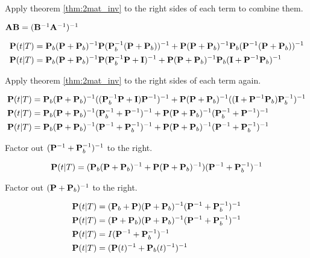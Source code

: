Apply theorem \ref{thm:2mat_inv} to the right sides of each term to combine
them.

\begin{theorem}
  \label{thm:2mat_inv}

  $\mathbf{A}\mathbf{B} = (\mathbf{B}^{-1}\mathbf{A}^{-1})^{-1}$
\end{theorem}

\begin{align*}
  \mathbf{P}(t|T) &=
    \mathbf{P}_b(\mathbf{P} + \mathbf{P}_b)^{-1}\mathbf{P}
      (\mathbf{P}_b^{-1}(\mathbf{P} + \mathbf{P}_b))^{-1} +
    \mathbf{P}(\mathbf{P} + \mathbf{P}_b)^{-1}\mathbf{P}_b
      (\mathbf{P}^{-1}(\mathbf{P} + \mathbf{P}_b))^{-1} \\
  \mathbf{P}(t|T) &= \mathbf{P}_b(\mathbf{P} + \mathbf{P}_b)^{-1}\mathbf{P}
      (\mathbf{P}_b^{-1}\mathbf{P} + \mathbf{I})^{-1} +
    \mathbf{P}(\mathbf{P} + \mathbf{P}_b)^{-1}\mathbf{P}_b
      (\mathbf{I} + \mathbf{P}^{-1}\mathbf{P}_b)^{-1}
\end{align*}

Apply theorem \ref{thm:2mat_inv} to the right sides of each term again.

\begin{align*}
  \mathbf{P}(t|T) &=
    \mathbf{P}_b(\mathbf{P} + \mathbf{P}_b)^{-1}
      ((\mathbf{P}_b^{-1}\mathbf{P} + \mathbf{I})\mathbf{P}^{-1})^{-1} +
    \mathbf{P}(\mathbf{P} + \mathbf{P}_b)^{-1}
      ((\mathbf{I} + \mathbf{P}^{-1}\mathbf{P}_b)\mathbf{P}_b^{-1})^{-1} \\
  \mathbf{P}(t|T) &=
    \mathbf{P}_b(\mathbf{P} + \mathbf{P}_b)^{-1}(\mathbf{P}_b^{-1} + \mathbf{P}^{-1})^{-1} +
    \mathbf{P}(\mathbf{P} + \mathbf{P}_b)^{-1}(\mathbf{P}_b^{-1} + \mathbf{P}^{-1})^{-1} \\
  \mathbf{P}(t|T) &= \mathbf{P}_b(\mathbf{P} + \mathbf{P}_b)^{-1}
    (\mathbf{P}^{-1} + \mathbf{P}_b^{-1})^{-1} +
    \mathbf{P}(\mathbf{P} + \mathbf{P}_b)^{-1}(\mathbf{P}^{-1} + \mathbf{P}_b^{-1})^{-1}
\end{align*}

Factor out $(\mathbf{P}^{-1} + \mathbf{P}_b^{-1})^{-1}$ to the right.

\begin{equation*}
  \mathbf{P}(t|T) =
    (\mathbf{P}_b(\mathbf{P} + \mathbf{P}_b)^{-1} + \mathbf{P}(\mathbf{P} + \mathbf{P}_b)^{-1})
    (\mathbf{P}^{-1} + \mathbf{P}_b^{-1})^{-1}
\end{equation*}

Factor out $(\mathbf{P} + \mathbf{P}_b)^{-1}$ to the right.

\begin{align}
  \mathbf{P}(t|T) &=
    (\mathbf{P}_b + \mathbf{P})(\mathbf{P} + \mathbf{P}_b)^{-1}
    (\mathbf{P}^{-1} + \mathbf{P}_b^{-1})^{-1} \nonumber \\
  \mathbf{P}(t|T) &=
    (\mathbf{P} + \mathbf{P}_b)(\mathbf{P} + \mathbf{P}_b)^{-1}
    (\mathbf{P}^{-1} + \mathbf{P}_b^{-1})^{-1} \nonumber \\
  \mathbf{P}(t|T) &= I(\mathbf{P}^{-1} + \mathbf{P}_b^{-1})^{-1} \nonumber \\
  \mathbf{P}(t|T) &= (\mathbf{P}(t)^{-1} + \mathbf{P}_b(t)^{-1})^{-1}
    \label{eq:ks_error_cov}
\end{align}

